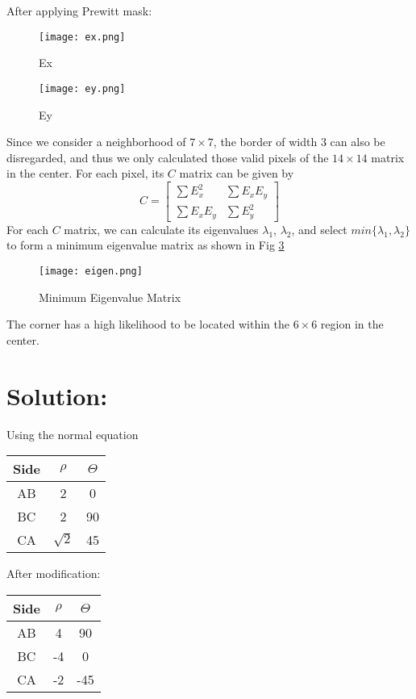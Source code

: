 \documentclass[12pt]{article}
\begin{document}
After applying Prewitt mask:
\begin{figure}[H]
\centering
\texttt{[image: ex.png]}
\caption{Ex}
\label{ex}
\end{figure}
\begin{figure}[H]
\centering
\texttt{[image: ey.png]}
\caption{Ey}
\label{ey}
\end{figure}
\noindent Since we consider a neighborhood of $7\times7$, the border of width 3 can also be disregarded, and thus we only calculated those valid pixels of the $14\times 14$ matrix in the center. For each pixel, its $C$ matrix can be given by 
\begin{equation*}
C = \left[ \begin{array}{cc}
\sum E_x^2 & \sum E_xE_y\\
\sum E_xE_y & \sum E_y^2
\end{array} \right]
\end{equation*}
For each $C$ matrix, we can calculate its eigenvalues $\lambda_1$,  $\lambda_2$, and select $min\{\lambda_1, \lambda_2\}$ to form a minimum eigenvalue matrix as shown in Fig \ref{eigen}
\begin{figure}[H]
\centering
\texttt{[image: eigen.png]}
\caption{Minimum Eigenvalue Matrix}
\label{eigen}
\end{figure}
\noindent The corner has a high likelihood to be located within the $6\times6$ region in the center.
\section{Solution:}
Using the normal equation

\begin{table*}[h]
\centering
\begin{tabular}{|c|c|c|}
\hline
\textbf{Side}&$\rho$& \textbf{$\Theta$}\\
\hline
AB & 2 & 0\\
BC & 2 & 90 \\
CA & $\sqrt{2}$ & 45\\
\hline
\end{tabular}
\end{table*}
\noindent After modification:\\
\begin{table*}[h]
\centering
\begin{tabular}{|c|c|c|}
\hline
\textbf{Side}&$\rho$& \textbf{$\Theta$}\\
\hline
AB & 4 & 90\\
BC & -4 & 0 \\
CA & -2 & -45\\
\hline
\end{tabular}
\end{table*}
\vfill
\clearpage
\end{document}
